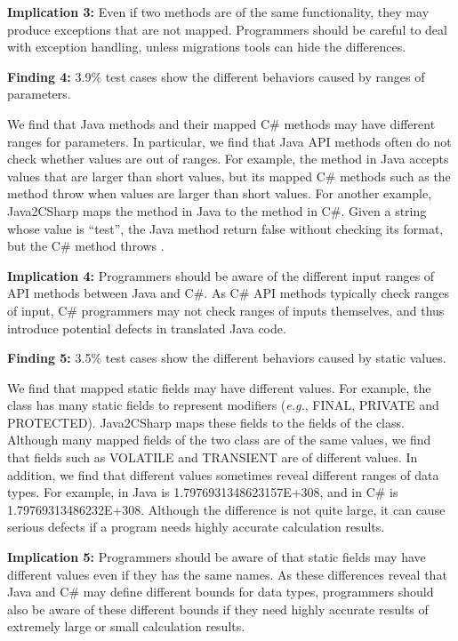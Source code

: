 \textbf{Implication 3:} Even if two methods are of the same functionality, they may produce exceptions that are not mapped. Programmers should be careful to deal with exception handling, unless migrations tools can hide the differences.

\textbf{Finding 4:} 3.9\% test cases show the different behaviors caused by ranges of parameters.

We find that Java methods and their mapped C\# methods may have different ranges for parameters. In particular, we find that Java API methods often do not check whether values are out of ranges. For example, the  method in Java accepts values that are larger than short values, but its mapped C\# methods such as the  method throw  when values are larger than short values. For another example, Java2CSharp maps the  method in Java to the  method in C\#. Given a string whose value is ``test'', the Java method return false without checking its format, but the C\# method throws .

\textbf{Implication 4:} Programmers should be aware of the different input ranges of API methods between Java and C\#. As C\# API methods typically check ranges of input, C\# programmers may not check ranges of inputs themselves, and thus introduce potential defects in translated Java code.

\textbf{Finding 5:} 3.5\% test cases show the different behaviors caused by static values.

We find that mapped static fields may have different values. For example, the  class has many static fields to represent modifiers (\emph{e.g.}, FINAL, PRIVATE and PROTECTED). Java2CSharp maps these fields to the fields of the  class. Although many mapped fields of the two class are of the same values, we find that fields such as VOLATILE and TRANSIENT are of different values. In addition, we find that different values sometimes reveal different ranges of data types. For example,  in Java is 1.7976931348623157E+308, and  in C\# is 1.79769313486232E+308. Although the difference is not quite large, it can cause serious defects if a program needs highly accurate calculation results.

\textbf{Implication 5:} Programmers should be aware of that static fields may have different values even if they has the same names. As these differences reveal that Java and C\# may define different bounds for data types, programmers should also be aware of these different bounds if they need highly accurate results of extremely large or small calculation results.

